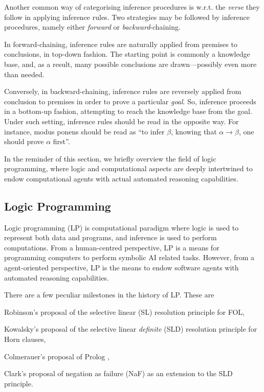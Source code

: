 \documentclass[12pt,a4paper,openright,twoside]{book}
\begin{document}
Another common way of categorising inference procedures is w.r.t. the \emph{verse} they follow in applying inference rules.
%
Two strategies may be followed by inference procedures, namely either \emph{forward} or \emph{backward}-chaining.

In forward-chaining, inference rules are naturally applied from premises to conclusions, in top-down fashion.
%
The starting point is commonly a knowledge base, and, as a result, many possible conclusions are drawn---possibly even more than needed.

Conversely, in backward-chaining, inference rules are reversely applied from conclusion to premises in order to prove a particular \emph{goal}.
%
So, inference proceeds in a bottom-up fashion, attempting to reach the knowledge base from the goal.
%
Under such setting, inference rules should be read in the opposite way.
%
For instance, modus ponens should be read as ``to infer $\beta$, knowing that $\alpha \rightarrow \beta$, one should prove $\alpha$ first''.

In the reminder of this section, we briefly overview the field of logic programming, where logic and computational aspects are deeply intertwined to endow computational agents with actual automated reasoning capabilities.

\subsection{Logic Programming}


Logic programming (LP) is computational paradigm where logic is used to represent both data and programs, and inference is used to perform computations.
%
From a human-centred perspective, LP is a means for programming computers to perform symbolic AI related tasks.
%
However, from a agent-oriented perspective, LP is the means to endow software agents with automated reasoning capabilities.

There are a few peculiar milestones in the history of LP.
%
These are
%
\begin{inlinelist}
    \item Robinson's proposal of the selective linear (SL) resolution principle \cite{robinson1965} for FOL,
    \item Kowalsky's proposal of the selective linear \emph{definite} (SLD) resolution principle \cite{Kowalski1976} for Horn clauses,
    \item Colmerauer's proposal of Prolog \cite{ColmerauerR93},
    \item Clark's proposal of negation as failure (NaF) \cite{Clark77} as an extension to the SLD  principle.
\end{inlinelist}
\end{document}
